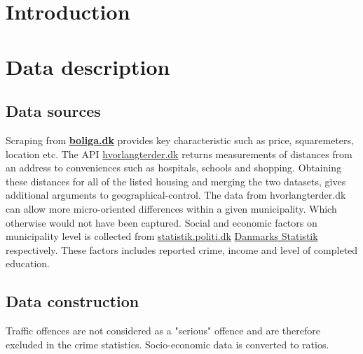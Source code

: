 \documentclass[12pt,a4paper]{article}
\begin{document}

\newpage
\onehalfspacing

\tableofcontents
\newpage
\section{Introduction}

\section{Data description}

\subsection{Data sources}
Scraping from \textbf{\href{https://www.boliga.dk}{boliga.dk}} provides key characteristic such as price, squaremeters, location etc.   \newline
The API \href{https://www.hvorlangterder.dk}{hvorlangterder.dk} returns measurements of distances from an address to conveniences such as hospitals, schools and shopping. Obtaining these distances for all of the listed housing and merging the two datasets, gives additional arguments to geographical-control. The data from hvorlangterder.dk can allow more micro-oriented differences within a given municipality. Which otherwise would not have been captured.  
\newline 
Social and economic factors on municipality level is collected from \href{https://statistik.politi.dk/QvAJAXZfc/opendoc.htm?document=QlikApplication%2F2999_Public\%2FPublic_IndsatsResultater.qvw}{statistik.politi.dk}   \newline 
\href{https://www.dst.dk/da/Statistik/emner/befolkning-og-valg}{Danmarks Statistik} respectively. These factors includes reported crime, income and level of completed education. 

\subsection{Data construction}
Traffic offences are not considered as a "serious" offence and are therefore excluded in the crime statistics. 
Socio-economic data is converted to ratios.
 
\end{document}
